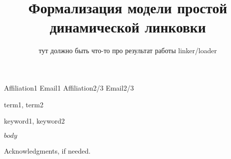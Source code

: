 \documentclass[preprint,10pt,numbers]{sigplanconf}
\begin{document}
\setlength{\pdfpageheight}{\paperheight}
\setlength{\pdfpagewidth}{\paperwidth}




\title{Формализация модели простой динамической линковки}
\subtitle{тут должно быть что-то про результат работы linker/loader}

           {Affiliation1}
           {Email1}
           {Affiliation2/3}
           {Email2/3}

\maketitle

\begin{abstract}

\end{abstract}


\terms
term1, term2

\keywords
keyword1, keyword2

$body$

\acks

Acknowledgments, if needed.






\end{document}

